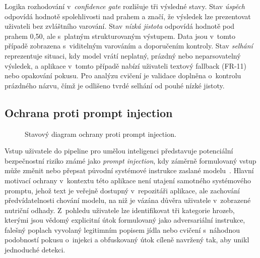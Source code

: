 Logika rozhodování v~\emph{confidence gate} rozlišuje tři výsledné stavy.
Stav \emph{úspěch} odpovídá hodnotě spolehlivosti nad prahem a značí, že výsledek lze prezentovat uživateli bez zvláštního varování.
Stav \emph{nízká jistota} odpovídá hodnotě pod prahem 0,50, ale s~platným strukturovaným výstupem.
Data jsou v~tomto případě zobrazena s~viditelným varováním a doporučením kontroly.
Stav \emph{selhání} reprezentuje situaci, kdy model vrátí neplatný, prázdný nebo neparsovatelný výsledek, a aplikace v~tomto případě nabízí uživateli textový fallback (FR-11) nebo opakování pokusu.
Pro analýzu cvičení je validace doplněna o~kontrolu prázdného názvu, čímž je odlišeno tvrdé selhání od pouhé nízké jistoty.

\subsection{Ochrana proti prompt injection}
\label{subsec:promptInjection}

\begin{figure}[!htb]
	\centering
	\resizebox{0.7\textwidth}{!}{}
	\caption{Stavový diagram ochrany proti prompt injection.}
	\label{fig:promptInjection}
\end{figure}

Vstup uživatele do pipeline pro umělou inteligenci představuje potenciální bezpečnostní riziko známé jako \emph{prompt injection}, kdy záměrně formulovaný vstup může změnit nebo přepsat původní systémové instrukce zaslané modelu~\cite{greshake2023indirect, owasp2025llm01}.
Hlavní motivací ochrany v~kontextu této aplikace není utajení samotného systémového promptu, jehož text je veřejně dostupný v~repozitáři aplikace, ale zachování předvídatelnosti chování modelu, na niž je vázána důvěra uživatele v~zobrazené nutriční odhady.
Z~pohledu uživatele lze identifikovat tři kategorie hrozeb, kterými jsou vědomý explicitní útok formulovaný jako adversariální instrukce, falešný poplach vyvolaný legitimním popisem jídla nebo cvičení s~náhodnou podobností pokusu o~injekci a obfuskovaný útok cíleně navržený tak, aby unikl jednoduché detekci.

